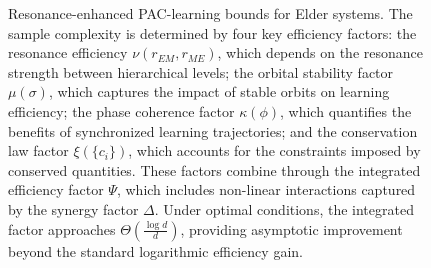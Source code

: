 \begin{figure}[t]
\begin{tikzpicture}[scale=0.9]
\end{tikzpicture}
\caption{Resonance-enhanced PAC-learning bounds for Elder systems. The sample complexity is determined by four key efficiency factors: the resonance efficiency $\nu(r_{EM}, r_{ME})$, which depends on the resonance strength between hierarchical levels; the orbital stability factor $\mu(\sigma)$, which captures the impact of stable orbits on learning efficiency; the phase coherence factor $\kappa(\phi)$, which quantifies the benefits of synchronized learning trajectories; and the conservation law factor $\xi(\{c_i\})$, which accounts for the constraints imposed by conserved quantities. These factors combine through the integrated efficiency factor $\Psi$, which includes non-linear interactions captured by the synergy factor $\Delta$. Under optimal conditions, the integrated factor approaches $\Theta(\frac{\log d}{d})$, providing asymptotic improvement beyond the standard logarithmic efficiency gain.}
\label{fig:resonance_pac}
\end{figure}